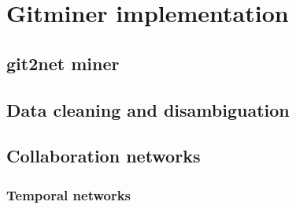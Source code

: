 

\section{Gitminer implementation}
\subsection{git2net miner}

\subsection{Data cleaning and disambiguation}

\subsection{Collaboration networks}

\subsubsection{Temporal networks}
